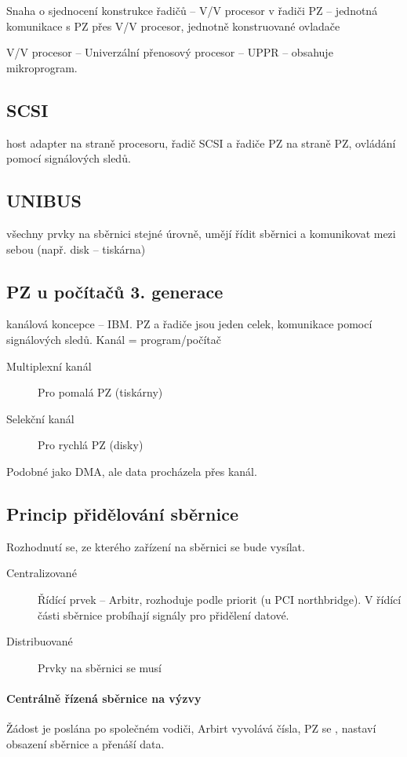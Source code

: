 \documentclass[a4paper, 11pt]{report}
\begin{document}
Snaha o sjednocení konstrukce řadičů -- V/V procesor v řadiči PZ -- jednotná komunikace s PZ přes V/V procesor, jednotně konstruované ovladače

V/V procesor -- Univerzální přenosový procesor -- UPPR -- obsahuje mikroprogram.

\subsection{SCSI}
host adapter na straně procesoru, řadič SCSI a řadiče PZ na straně PZ, ovládání pomocí signálových sledů.

\subsection{UNIBUS}
všechny prvky na sběrnici stejné úrovně, umějí řídit sběrnici a komunikovat mezi sebou (např. disk -- tiskárna)

\subsection{PZ u počítačů 3. generace}
kanálová koncepce -- IBM. PZ a řadiče jsou jeden celek, komunikace pomocí signálových sledů. Kanál = program/počítač

\begin{description}
	\item[Multiplexní kanál] Pro pomalá PZ (tiskárny)
	\item[Selekční kanál] Pro rychlá PZ (disky)
\end{description}

Podobné jako DMA, ale data procházela přes kanál.

\subsection{Princip přidělování sběrnice}

Rozhodnutí se, ze kterého zařízení na sběrnici se bude vysílat.

\begin{description}
	\item[Centralizované] Řídící prvek -- Arbitr, rozhoduje podle priorit (u PCI northbridge). V řídící části sběrnice probíhají signály pro přidělení datové.
	\item[Distribuované] Prvky na sběrnici se musí 
\end{description}

\paragraph{Centrálně řízená sběrnice na výzvy}
Žádost je poslána po společném vodiči, Arbirt vyvolává čísla, PZ se , nastaví obsazení sběrnice a přenáší data.
\end{document}
